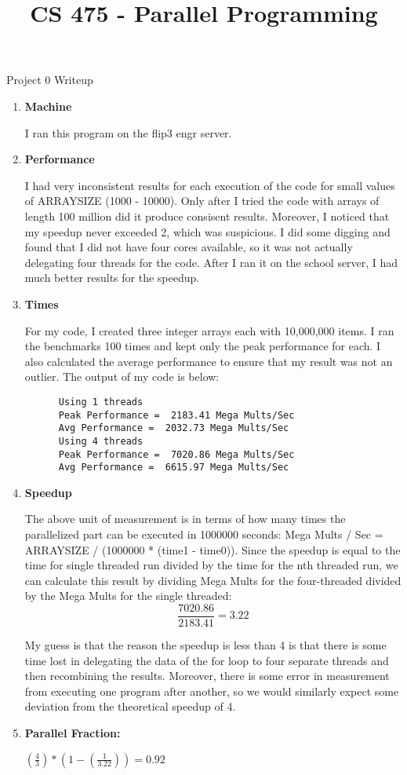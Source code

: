 \documentclass[11pt,letterpaper]{article}
\begin{document}
 \univlogo

\title{CS 475 - Parallel Programming}
{\Huge Project 0 Writeup}\\[5mm]

\begin{enumerate}
  \item \textbf{Machine} 
      
      I ran this program on the flip3 engr server. 

  \item \textbf{Performance} 

    I had very inconsistent results for each execution of the code for 
      small values of ARRAYSIZE (1000 - 10000). Only after I tried the code with arrays of
      length 100 million did it produce consisent results. Moreover, I noticed
      that my speedup never exceeded 2, which was suspicious. I did some
      digging and found that I did not have four cores available, so it was
      not actually delegating four threads for the code. After I ran it on
      the school server, I had much better results for the speedup. 

  \item \textbf{Times} 

    For my code, I created three integer arrays each with 10,000,000 items. 
    I ran the benchmarks 100 times and kept only the peak performance for each. 
    I also calculated the average performance to ensure that my result was 
    not an outlier. The output of my code is below: 
    \begin{lstlisting}
      Using 1 threads
      Peak Performance =  2183.41 Mega Mults/Sec
      Avg Performance =  2032.73 Mega Mults/Sec
      Using 4 threads
      Peak Performance =  7020.86 Mega Mults/Sec
      Avg Performance =  6615.97 Mega Mults/Sec
    \end{lstlisting}

  \item \textbf{Speedup}

    The above unit of measurement is in terms of how many times the 
    parallelized part can be executed in 1000000 seconds: 
    Mega Mults / Sec =  ARRAYSIZE / (1000000 * (time1 - time0)). 
    Since the speedup is equal to the time for single threaded run divided by
    the time for the nth threaded run, we can calculate this result by 
    dividing Mega Mults for the four-threaded divided by the Mega Mults for
    the single threaded: 
    \[ \frac{7020.86}{2183.41} = \mathbf{3.22} \]

    My guess is that the reason the speedup is less than 4 is that there is 
    some time lost in delegating the data of the for loop to four separate 
    threads and then recombining the results. Moreover, there is some error
    in measurement from executing one program after another, so we would 
    similarly expect some deviation from the theoretical speedup of 4.

  \item \textbf{Parallel Fraction:}

$ (\frac{4}{3}) * (1 - (\frac{1}{3.22})) = \mathbf{0.92}$

\end{enumerate}
\end{document}
